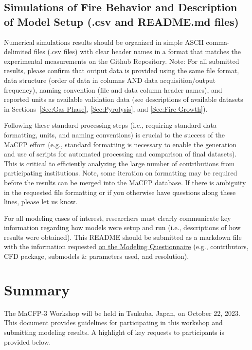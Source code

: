 \documentclass[12pt]{article}
\begin{document}
\subsection{Simulations of Fire Behavior and Description of Model Setup (.csv and README.md files)}
Numerical simulations results should be organized in simple ASCII comma-delimited files (.csv files) with clear header names in a format that matches the experimental measurements on the Github Repository. Note: For all submitted results, please confirm that output data is provided using the same file format, data structure (order of data in columns AND data acquisition/output frequency), naming convention (file and data column header names), and reported units as available validation data (see descriptions of available datasets in Sections~\ref{Sec:Gas Phase}, \ref{Sec:Pyrolysis}, and \ref{Sec:Fire Growth}).

Following these standard processing steps (i.e., requiring standard data formatting, units, and naming conventions) is crucial to the success of the MaCFP effort (e.g., standard formatting is necessary to enable the generation and use of scripts for automated processing and comparison of final datasets). This is critical to efficiently analyzing the large number of contributions from participating institutions. Note, some iteration on formatting may be required before the results can be merged into the MaCFP database. If there is ambiguity in the requested file formatting or if you otherwise have questions along these lines, please let us know.

For all modeling cases of interest, researchers must clearly communicate key information regarding how models were setup and run (i.e., descriptions of how results were obtained). This README should be submitted as a markdown file with the information requested \href{https://github.com/MaCFP/macfp-db/blob/master/Utilities/model_questionnaire.md}{on the Modeling Questionnaire} (e.g., contributors, CFD package, submodels \& parameters used, and resolution).

\section{Summary}
\label{Sec:Summary}
The MaCFP-3 Workshop will be held in Tsukuba, Japan, on October 22, 2023. This document provides guidelines for participating in this workshop and submitting modeling results. A highlight of key requests to participants is provided below.\\
\end{document}
